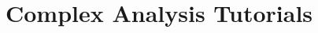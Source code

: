 \documentclass[a4paper, answers]{exam}
\title{Complex Analysis Tutorials}
\author{}
\begin{document}
    \maketitle
    \begin{questions}
        
%       
    \end{questions}
\end{document}
